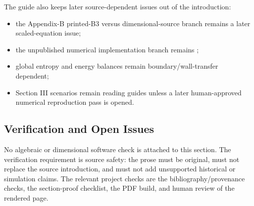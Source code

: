 The guide also keeps later source-dependent issues out of the introduction:

\begin{itemize}
\item the Appendix-B printed-B3 versus dimensional-source branch remains a later
  scaled-equation issue;
\item the unpublished numerical implementation branch remains
  ;
\item global entropy and energy balances remain boundary/wall-transfer
  dependent;
\item Section III scenarios remain reading guides unless a later human-approved
  numerical reproduction pass is opened.
\end{itemize}

\subsection{Verification and Open Issues}

No algebraic or dimensional software check is attached to this section.  The
verification requirement is source safety: the prose must be original, must not
replace the source introduction, and must not add unsupported historical or
simulation claims.  The relevant project checks are the bibliography/provenance
checks, the section-proof checklist, the PDF build, and human review of the
rendered page.
